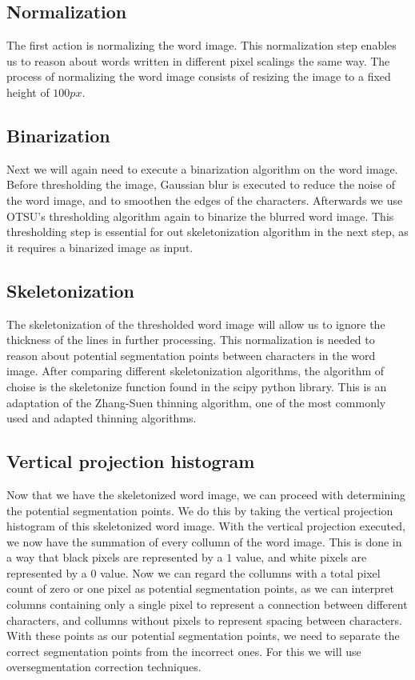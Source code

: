 \documentclass{article}
\begin{document}
\subsection{Normalization} %
The first action is normalizing the word image.
This normalization step enables us to reason about words written in different pixel scalings the same way.
The process of normalizing the word image consists of resizing the image to a fixed height of $100px$.

\subsection{Binarization}
Next we will again need to execute a binarization algorithm on the word image.
Before thresholding the image, Gaussian blur is executed to reduce the noise of the word image, and to smoothen the edges of the characters.
Afterwards we use OTSU's thresholding algorithm again to binarize the blurred word image.
This thresholding step is essential for out skeletonization algorithm in the next step, as it requires a binarized image as input.

\subsection{Skeletonization}
The skeletonization of the thresholded word image will allow us to ignore the thickness of the lines in further processing.
This normalization is needed to reason about potential segmentation points between characters in the word image.
After comparing different skeletonization algorithms, the algorithm of choise is the skeletonize function found in the scipy python library.
This is an adaptation of the Zhang-Suen thinning algorithm, one of the most commonly used and adapted thinning algorithms.
\citep{zsthinning}

\subsection{Vertical projection histogram}
Now that we have the skeletonized word image, we can proceed with determining the potential segmentation points.
We do this by taking the vertical projection histogram of this skeletonized word image.
With the vertical projection executed, we now have the summation of every collumn of the word image.
This is done in a way that black pixels are represented by a $1$ value, and white pixels are represented by a $0$ value.
Now we can regard the collumns with a total pixel count of zero or one pixel as potential segmentation points, as we can interpret columns containing only a single pixel to represent a connection between different characters, and collumns without pixels to represent spacing between characters.
With these points as our potential segmentation points, we need to separate the correct segmentation points from the incorrect ones.
For this we will use oversegmentation correction techniques.
\end{document}
